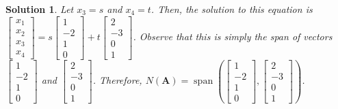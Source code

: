 \documentclass[]{book}
\DeclareMathOperator{\vecspan}{span}
\newcommand{\vecxxxx}[1][x]{\ensuremath{\begin{bmatrix}
#1_1 \\
#1_2 \\
#1_3 \\
#1_4
\end{bmatrix}}}
\newtheorem*{solution}{Solution}
\begin{document}
\begin{example}
\begin{solution}
    Let $x_3=s$ and $x_4=t$. Then, the solution to this equation is $\vecxxxx = s\begin{bmatrix}1 \\ -2 \\ 1 \\ 0\end{bmatrix} + t\begin{bmatrix}2 \\ -3 \\ 0 \\ 1\end{bmatrix}$. Observe that this is simply the span of vectors $\begin{bmatrix}1 \\ -2 \\ 1 \\ 0\end{bmatrix}$ and $\begin{bmatrix}2 \\ -3 \\ 0 \\ 1\end{bmatrix}$. Therefore, $N(\mathbf{A}) = \vecspan\left(\begin{bmatrix}1 \\ -2 \\ 1 \\ 0\end{bmatrix}, \begin{bmatrix}2 \\ -3 \\ 0 \\ 1\end{bmatrix}\right)$. \hfill \qedsymbol
\end{solution}
\end{example}
\end{document}
